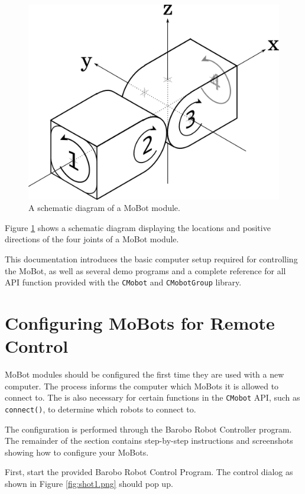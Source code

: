 \documentclass{article}
\begin{document}
\begin{figure}[H]
\begin{center}
\includegraphics[width=4.5in]{images/joint_diagram_verbose.png}
\end{center}
\caption{\label{fig:joint_diagram_verbose.png} A schematic diagram of a MoBot module.}
\end{figure}

Figure \ref{fig:joint_diagram_verbose.png} shows a schematic diagram displaying the
locations and positive directions of the four joints of a MoBot module. 

This documentation introduces the basic computer setup required for controlling 
the MoBot, as well as several demo programs and a complete reference for all
API function provided with the \texttt{CMobot} and \texttt{CMobotGroup} library.

\section{\label{sec:pairing}Configuring MoBots for Remote Control}
MoBot modules should be configured the first time they are used with 
a new computer. The process informs the computer which MoBots it
is allowed to connect to. The is also necessary for certain 
functions in the \texttt{CMobot} API, such as \texttt{connect()},
to determine which robots to connect to.

The configuration is performed through the Barobo Robot Controller
program. The remainder of the section contains step-by-step instructions
and screenshots showing how to configure your MoBots.

First, start the provided Barobo Robot Control Program. The 
control dialog as shown in Figure \ref{fig:shot1.png} should pop up.
\end{document}
